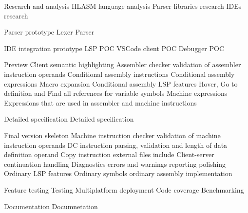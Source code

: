 \newpage

\bms
	\itemm Research and analysis 
		\bwp
			\itemwp HLASM language analysis 
			\itemwp Parser libraries research 
			\itemwp IDEs research 
		\eenum
	
	\itemm Parser prototype 
		\bwp
			\itemwp Lexer 
			\itemwp Parser 
		\eenum
	
	\itemm IDE integration prototype 
		\bwp
			\itemwp LSP POC 
			\itemwp VSCode client POC 
			\itemwp Debugger POC 
		\eenum
	
	\itemm \label{milestone_preview} Preview 
		\bwp
			\itemwp Client semantic highlighting 
			\itemwp Assembler checker 
					\tiny validation of assembler instruction operands
			\itemwp Conditional assembly instructions 
			\itemwp Conditional assembly expressions 
			\itemwp Macro expansion 
			\itemwp Conditional assembly LSP features 
					\tiny Hover, Go to definition and Find all references for variable symbols
			\itemwp Machine expressions 
					\tiny Expressions that are used in assembler and machine instructions
		\eenum
	
	\itemm Detailed specification 
		\bwp
			\itemwp Detailed specification 
		\eenum
	
	\itemm Final version skeleton 
		\bwp
			\itemwp Machine instruction checker 
					\tiny validation of machine instruction operands
			\itemwp DC instruction 
					\tiny parsing, validation and length of data definition operand
			\itemwp Copy instruction 
					\tiny external files include
			\itemwp Client-server continuation handling 
			\itemwp Diagnostics 
					\tiny errors and warnings reporting polishing
			\itemwp Ordinary LSP features 
			\itemwp Ordinary symbols 
					\tiny ordinary assembly implementation
		\eenum
	
	\itemm Feature testing 
		\bwp
			\itemwp Testing 
			\itemwp Multiplatform deployment 
			\itemwp Code coverage 
			\itemwp Benchmarking 
		\eenum
	
	\itemm Documentation 
		\bwp
			\itemwp Documnetation 
		\eenum
	
